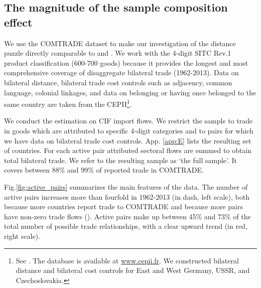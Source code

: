 \documentclass[12pt,twoside,a4paper,notitlepage]{article}
\begin{document}
\subsection{The magnitude of the sample composition effect} \label{subsec:data}
We use the COMTRADE dataset to make our investigation of the distance puzzle directly comparable to \cite{Head2013} and \cite{Berthelon2008}. We work with the 4-digit SITC Rev.1 product classification (600-700 goods) because it provides the longest and most comprehensive coverage of disaggregate bilateral trade (1962-2013). 
Data on bilateral distance, bilateral trade cost controls such as adjacency, common language, colonial linkages, and data on belonging or having once belonged to the same country are taken from the CEPII\footnote{See \cite{Mayer2011}. The database is available at \url{www.cepii.fr}. We constructed bilateral distance and bilateral cost controls for East and West Germany, USSR, and Czechoslovakia.}. 

We conduct the estimation on CIF import flows. We restrict the sample to trade in goods which are attributed to specific 4-digit categories and to pairs for which we have data on bilateral trade cost controls. App. \ref{app:E} lists the resulting set of countries. For each active pair attributed sectoral flows are summed to obtain total bilateral trade. We refer to the resulting sample as `the full sample'. It covers between 88\% and 99\% of reported trade in COMTRADE.

Fig.\ref{fig:active_pairs} summarizes the main features of the data. The number of active pairs increases more than fourfold in 1962-2013 (in dash, left scale), both because more countries report trade to COMTRADE and because more pairs have non-zero trade flows (\cite{Helpman2008}). Active pairs make up between 45\% and 73\% of the total number of possible trade relationships, with a clear upward trend (in red, right scale).
\end{document}
